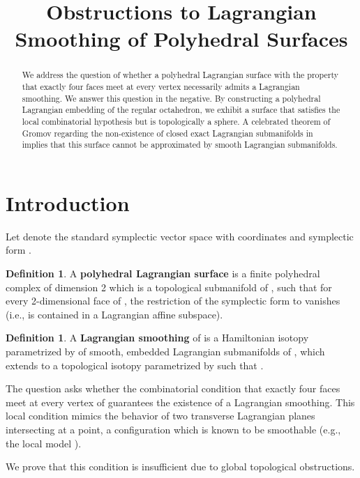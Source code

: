 \documentclass[11pt]{article}
\theoremstyle{definition}
\newtheorem{definition}[theorem]{Definition}
\begin{document}
\title{Obstructions to Lagrangian Smoothing of Polyhedral Surfaces}
\author{}
\date{}
\maketitle

\begin{abstract}
We address the question of whether a polyhedral Lagrangian surface  with the property that exactly four faces meet at every vertex necessarily admits a Lagrangian smoothing. We answer this question in the negative. By constructing a polyhedral Lagrangian embedding of the regular octahedron, we exhibit a surface that satisfies the local combinatorial hypothesis but is topologically a sphere. A celebrated theorem of Gromov regarding the non-existence of closed exact Lagrangian submanifolds in  implies that this surface cannot be approximated by smooth Lagrangian submanifolds.
\end{abstract}

\section{Introduction}

Let  denote the standard symplectic vector space with coordinates  and symplectic form .

\begin{definition}
A \textbf{polyhedral Lagrangian surface}  is a finite polyhedral complex of dimension 2 which is a topological submanifold of , such that for every 2-dimensional face  of , the restriction of the symplectic form to  vanishes (i.e.,  is contained in a Lagrangian affine subspace).
\end{definition}

\begin{definition}
A \textbf{Lagrangian smoothing} of  is a Hamiltonian isotopy  parametrized by  of smooth, embedded Lagrangian submanifolds of , which extends to a topological isotopy parametrized by  such that .
\end{definition}

The question asks whether the combinatorial condition that exactly four faces meet at every vertex of  guarantees the existence of a Lagrangian smoothing. This local condition mimics the behavior of two transverse Lagrangian planes intersecting at a point, a configuration which is known to be smoothable (e.g., the local model ).

We prove that this condition is insufficient due to global topological obstructions.
\end{document}
